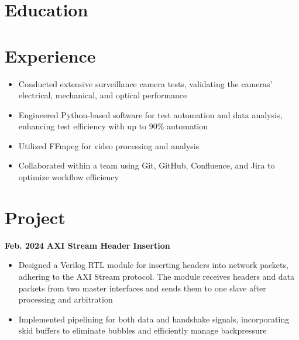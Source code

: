 \documentclass[11pt,a4paper,sans]{moderncv}
\begin{document}
\makecvtitle

\section{Education}

\section{Experience}
{
    \begin{itemize}
    \item Conducted extensive surveillance camera tests, validating the cameras' electrical, mechanical, and optical performance
    \item Engineered Python-based software for test automation and data analysis, enhancing test efficiency with up to 90\% automation
    \item Utilized FFmpeg for video processing and analysis
    \item Collaborated within a team using Git, GitHub, Confluence, and Jira to optimize workflow efficiency
    \end{itemize}
}

\section{Project}

\cventry
{\textnormal{\textbf{Feb. 2024}}}
{\textnormal{\textbf{AXI Stream Header Insertion}}}
{}{}{}
{
    \begin{itemize}
        \item Designed a Verilog RTL module for inserting headers into network packets, adhering to the AXI Stream protocol. The module receives headers and data packets from two master interfaces and sends them to one slave after processing and arbitration
        \item Implemented pipelining for both data and handshake signals, incorporating skid buffers to eliminate bubbles and efficiently manage backpressure
    \end{itemize}
}
\end{document}
